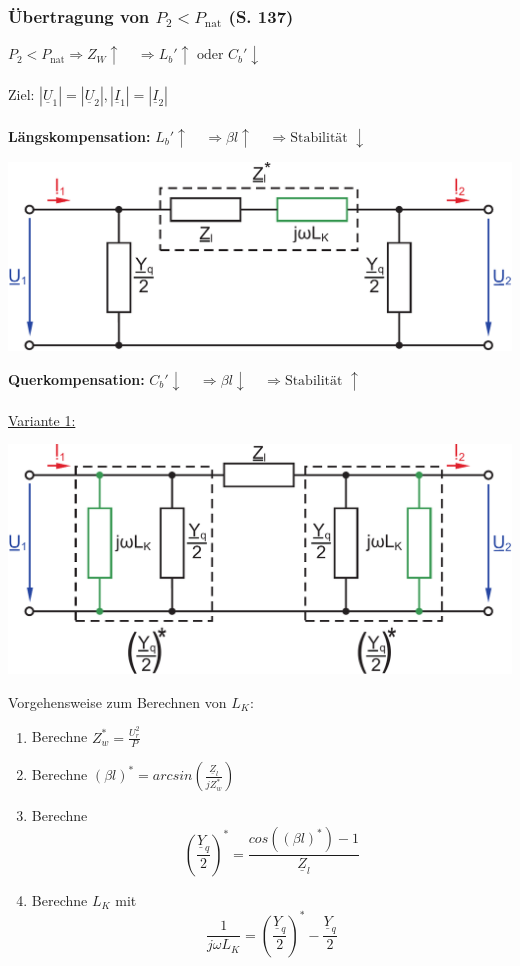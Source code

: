\documentclass[a4paper,twocolumn,10pt]{article}
\begin{document}
\subsubsection{Übertragung von $P_2<P_{\text{nat}}$ (S. 137)}
$P_2<P_{\text{nat}}\Rightarrow Z_W\uparrow\;\;\;\;\Rightarrow L_b'\uparrow\text{ oder }C_b'\downarrow$\\\\
Ziel: $|\underline{U}_1|=|\underline{U}_2|,|\underline{I}_1|=|\underline{I}_2|$\\\\
\textbf{Längskompensation:} $L_b'\uparrow\;\;\;\;\Rightarrow\beta l\uparrow\;\;\;\;\Rightarrow\text{Stabilität }\downarrow$
\begin{center}
\includegraphics[width=0.98\columnwidth]{Grafiken/Laengskompensation_1}
\end{center}
\vspace{0.3cm}
\textbf{Querkompensation:} $C_b'\downarrow\;\;\;\;\Rightarrow\beta l\downarrow\;\;\;\;\Rightarrow\text{Stabilität }\uparrow$\\\\
\underline{Variante 1:}
\begin{center}
\includegraphics[width=0.98\columnwidth]{Grafiken/Querkompensation_1}
\end{center}
Vorgehensweise zum Berechnen von $L_K$:
\begin{enumerate}
\item Berechne \quad $Z_w^*=\frac{U_r^2}{P}$
\item Berechne \quad $(\beta l)^*=arcsin\left(\frac{\underline{Z}_l}{jZ_w^*}\right)$
\item Berechne
\begin{equation*}
\left(\frac{\underline{Y}_q}{2}\right)^*=\frac{cos\left((\beta l)^*\right)-1}{\underline{Z}_l}
\end{equation*}
\item Berechne $L_K$ mit
\begin{equation*}
\frac{1}{j\omega L_K}=\left(\frac{\underline{Y}_q}{2}\right)^*-\frac{\underline{Y}_q}{2}
\end{equation*}
\end{enumerate}
\end{document}
